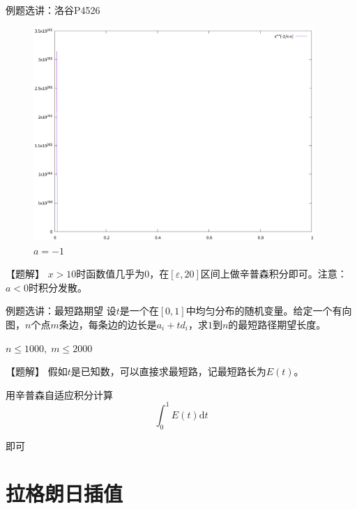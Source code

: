 \documentclass{beamer}
\begin{document}
\begin{frame}{例题选讲：洛谷P4526}
\begin{figure}
\begin{minipage}[t]{0.32\textwidth}
        \end{minipage}
        \begin{minipage}[t]{0.32\textwidth}
            \centering
            \includegraphics[width=0.95\textwidth]{pic/p4526-3.eps}
            \caption{$a=-1$}
        \end{minipage}
    \end{figure}

    \pause
    【题解】 $x>10$时函数值几乎为$0$，在$[\varepsilon,20]$区间上做辛普森积分即可。注意：$a<0$时积分发散。
\end{frame}

\begin{frame}{例题选讲：最短路期望}
    设$t$是一个在$[0,1]$中均匀分布的随机变量。给定一个有向图，$n$个点$m$条边，每条边的边长是$a_i+td_i$，求$1$到$n$的最短路径期望长度。

    $n\leq 1000,\; m\leq 2000$

    \pause
    \vspace{1em}
    【题解】 假如$t$是已知数，可以直接求最短路，记最短路长为$E(t)$。

    \pause
    \vspace{1em}
    用辛普森自适应积分计算
    \begin{equation*}
        \int_0^1 E(t) \text{d} t
    \end{equation*}
    
    即可
\end{frame}

\section{拉格朗日插值}
\end{document}
